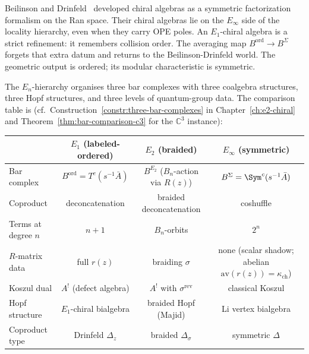 \begin{remark}
\label{rem:comparison-bd}
Beilinson and Drinfeld~\cite{BeilinsonDrinfeld} developed chiral algebras as a symmetric factorization formalism on the Ran space. Their chiral algebras lie on the $E_\infty$ side of the locality hierarchy, even when they carry OPE poles. An $E_1$-chiral algebra is a strict refinement: it remembers collision order. The averaging map $B^{\mathrm{ord}} \to B^{\Sigma}$ forgets that extra datum and returns to the Beilinson-Drinfeld world. The geometric output is ordered; its modular characteristic is symmetric.
\end{remark}

\begin{remark}
\label{rem:e1-vs-einfty-bialgebras}
The $E_n$-hierarchy organises three bar complexes with three coalgebra
structures, three Hopf structures, and three levels of
quantum-group data. The comparison table is
(cf.\ Construction~\ref{constr:three-bar-complexes} in
Chapter~\ref{ch:e2-chiral} and
Theorem~\ref{thm:bar-comparison-c3} for the $\mathbb{C}^3$ instance):
\begin{center}
\renewcommand{\arraystretch}{1.3}
\begin{tabular}{lccc}
\toprule
 & \textbf{$E_1$ (labeled-ordered)} & \textbf{$E_2$ (braided)}
 & \textbf{$E_\infty$ (symmetric)} \\
\midrule
Bar complex & $B^{\mathrm{ord}} = T^c(s^{-1}\bar A)$
 & $B^{E_2}$ ($B_n$-action via $R(z)$)
 & $B^{\Sigma} = \Sym^c(s^{-1}\bar A)$ \\
Coproduct & deconcatenation & braided deconcatenation
 & coshuffle \\
Terms at degree $n$ & $n+1$ & $B_n$-orbits & $2^n$ \\
$R$-matrix data & full $r(z)$ & braiding $\sigma$ & none
 (scalar shadow; abelian $\mathrm{av}(r(z)) = \kappa_{\mathrm{ch}}$) \\
Koszul dual & $A^!$ (defect algebra) & $A^!$ with
 $\sigma^{\mathrm{rev}}$ & classical Koszul \\
Hopf structure & $E_1$-chiral bialgebra & braided Hopf
 (Majid) & Li vertex bialgebra \\
Coproduct type & Drinfeld $\Delta_z$ & braided
 $\Delta_\sigma$ & symmetric $\Delta$ \\
\bottomrule
\end{tabular}
\end{center}


\end{remark}
